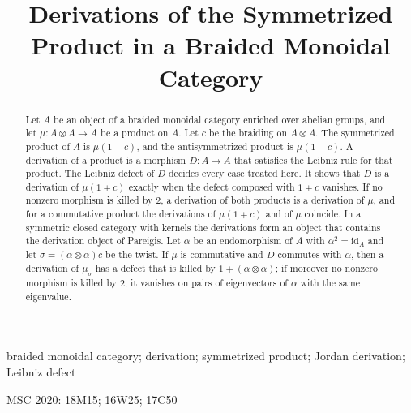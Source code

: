 \documentclass[]{interact}
\theoremstyle{plain}
\theoremstyle{definition}
\theoremstyle{remark}
\newcommand{\id}{\mathrm{id}}
\newcommand{\paperversion}{3}
\begin{document}
\title{Derivations of the Symmetrized Product in a Braided Monoidal Category}
\author{
}

\history{Preprint version \paperversion, compiled \today}

\maketitle

\begin{abstract}
Let $A$ be an object of a braided monoidal category enriched over abelian groups, and let $\mu \colon A \otimes A \to A$ be a product on $A$.
Let $c$ be the braiding on $A \otimes A$.
The symmetrized product of $A$ is $\mu(1 + c)$, and the antisymmetrized product is $\mu(1 - c)$.
A derivation of a product is a morphism $D \colon A \to A$ that satisfies the Leibniz rule for that product.
The Leibniz defect of $D$ decides every case treated here.
It shows that $D$ is a derivation of $\mu(1 \pm c)$ exactly when the defect composed with $1 \pm c$ vanishes.
If no nonzero morphism is killed by $2$, a derivation of both products is a derivation of $\mu$, and for a commutative product the derivations of $\mu(1 + c)$ and of $\mu$ coincide.
In a symmetric closed category with kernels the derivations form an object that contains the derivation object of Pareigis.
Let $\alpha$ be an endomorphism of $A$ with $\alpha^2 = \id_A$ and let $\sigma = (\alpha \otimes \alpha)c$ be the twist.
If $\mu$ is commutative and $D$ commutes with $\alpha$, then a derivation of $\mu_\sigma$ has a defect that is killed by $1 + (\alpha \otimes \alpha)$; if moreover no nonzero morphism is killed by $2$, it vanishes on pairs of eigenvectors of $\alpha$ with the same eigenvalue.
\end{abstract}

\begin{keywords}
braided monoidal category; derivation; symmetrized product; Jordan derivation; Leibniz defect
\end{keywords}

\begin{amscode}
MSC 2020: 18M15; 16W25; 17C50
\end{amscode}
\end{document}
